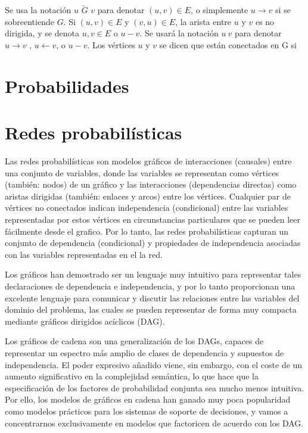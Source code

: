 Se usa la notación $u$ $\underrightarrow{G}$ $v$ para denotar $(u,v) \in E$, o simplemente 
$u \rightarrow v$ si se sobreentiende $G$. Si $(u,v) \in E$ y $(v,u) \in E$, la arista 
entre $u$ y $v$ es no dirigida, y se denota ${u,v} \in E$ o $u - v$. Se usará la notación 
$u ~ v$ para denotar $u \rightarrow v$ , $u \leftarrow v$, o $u - v$. Los vértices $u$ y $v$ 
se dicen que están conectados en G si



\section{Probabilidades} 

\section{Redes probabilísticas}
Las redes probabilísticas son modelos gráficos de interacciones (causales) entre una
conjunto de variables, donde las variables se representan como vértices (también: nodos)
de un gráfico y las interacciones (dependencias directas) como aristas dirigidas (también:
enlaces y arcos) entre los vértices. Cualquier par de vértices no conectados indican 
independencia (condicional) entre las variables representadas
por estos vértices en circunstancias particulares que se pueden leer fácilmente desde el
grafico. Por lo tanto, las redes probabilísticas capturan un conjunto de dependencia (condicional)
y propiedades de independencia asociadas con las variables representadas en el
la red.

Los gráficos han demostrado ser un lenguaje muy intuitivo para representar
tales declaraciones de dependencia e independencia, y por lo tanto proporcionan una excelente
lenguaje para comunicar y discutir las relaciones entre las 
variables del dominio del problema, las cuales se pueden representar de forma muy compacta 
mediante gráficos dirigidos acíclicos (DAG).

Los gráficos de cadena son una generalización de los DAGs, capaces de representar un espectro más amplio de 
clases de dependencia y supuestos de independencia. El poder expresivo añadido
viene, sin embargo, con el coste de un aumento significativo en la complejidad semántica, 
lo que hace que la especificación de los factores de probabilidad conjunta sea mucho menos intuitiva.
Por ello, los modelos de gráficos en cadena han ganado muy poca
popularidad como modelos prácticos para los sistemas de soporte de decisiones, y vamos a
concentrarnos exclusivamente en modelos que factoricen de acuerdo con los DAG.

